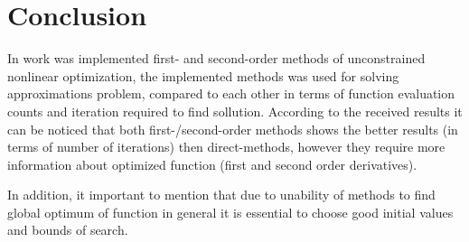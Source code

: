 \section*{Conclusion}

In work was implemented first- and second-order methods of unconstrained nonlinear optimization, the implemented methods was 
used for solving approximations problem, compared to each other in terms of function evaluation counts and iteration required to find sollution.
According to the received results it can be noticed that both first-/second-order methods shows the better results (in terms of number of iterations) then direct-methods, however they require more information about optimized function (first and second order derivatives).

In addition, it important to mention that due to unability of methods to find global optimum of function in general it is essential to choose good initial values and bounds of search.